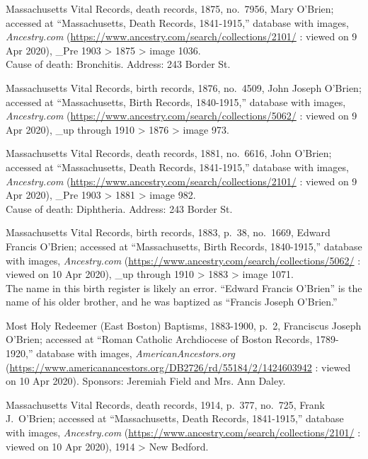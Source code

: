 \begin{thebibliography}{999}
	Massachusetts Vital Records, death records, 1875, no.\ 7956, Mary O'Brien; accessed at ``Massachusetts, Death Records, 1841-1915,'' database with images, \textit{Ancestry.com} (\url{https://www.ancestry.com/search/collections/2101/} : viewed on 9 Apr 2020), \_Pre 1903 > 1875 > image 1036.\\
	Cause of death: Bronchitis. Address: 243 Border St.
	
	Massachusetts Vital Records, birth records, 1876, no.\ 4509, John Joseph O'Brien; accessed at ``Massachusetts, Birth Records, 1840-1915,'' database with images, \textit{Ancestry.com} (\url{https://www.ancestry.com/search/collections/5062/} : viewed on 9 Apr 2020), \_up through 1910 > 1876 > image 973.
	
	Massachusetts Vital Records, death records, 1881, no.\ 6616, John O'Brien; accessed at ``Massachusetts, Death Records, 1841-1915,'' database with images, \textit{Ancestry.com} (\url{https://www.ancestry.com/search/collections/2101/} : viewed on 9 Apr 2020), \_Pre 1903 > 1881 > image 982.\\
	Cause of death: Diphtheria. Address: 243 Border St.
	
	Massachusetts Vital Records, birth records, 1883, p.\ 38, no.\ 1669, Edward Francis O'Brien; accessed at ``Massachusetts, Birth Records, 1840-1915,'' database with images, \textit{Ancestry.com} (\url{https://www.ancestry.com/search/collections/5062/} : viewed on 10 Apr 2020), \_up through 1910 > 1883 > image 1071.\\
	The name in this birth register is likely an error. ``Edward Francis O'Brien'' is the name of his older brother, and he was baptized as ``Francis Joseph O'Brien.''
	
	Most Holy Redeemer (East Boston) Baptisms, 1883-1900, p.\ 2, Franciscus Joseph O'Brien; accessed at ``Roman Catholic Archdiocese of Boston Records, 1789-1920,'' database with images, \textit{AmericanAncestors.org} (\url{https://www.americanancestors.org/DB2726/rd/55184/2/1424603942} : viewed on 10 Apr 2020).	
	Sponsors: Jeremiah Field and Mrs. Ann Daley.
	
	Massachusetts Vital Records, death records, 1914, p.\ 377, no.\ 725, Frank J.\ O'Brien; accessed at ``Massachusetts, Death Records, 1841-1915,'' database with images, \textit{Ancestry.com} (\url{https://www.ancestry.com/search/collections/2101/} : viewed on 10 Apr 2020), 1914 > New Bedford.
	

\end{thebibliography}
